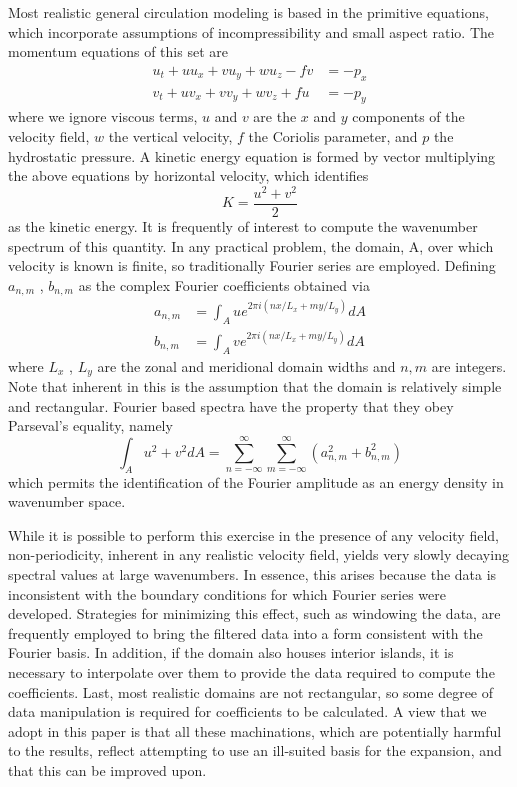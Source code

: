\documentclass[draft]{agujournal2019}
\begin{document}
Most realistic general circulation modeling is based in the primitive equations, which incorporate assumptions of incompressibility and small aspect ratio. The momentum equations of this set are
\begin{subequations}
    \begin{align}
        u_t + uu_x + vu_y + wu_z - fv &= -p_x \\
        v_t + uv_x + vv_y + wv_z + fu &= -p_y
    \end{align}
\end{subequations}
where we ignore viscous terms, $u$ and $v$ are the $x$ and $y$ components of the velocity field, $w$ the vertical velocity, $f$ the Coriolis parameter, and $p$ the hydrostatic pressure. A kinetic energy equation is formed by vector multiplying the above equations by horizontal velocity, which identifies
\begin{equation}
    K = \frac{u^2 + v^2}{2}
\end{equation}
as the kinetic energy. It is frequently of interest to compute the wavenumber spectrum of this quantity. In any practical problem, the domain, A, over which velocity is known is finite, so traditionally Fourier series are employed. Defining $a_{n,m}$ , $b_{n,m}$ as the complex Fourier coefficients obtained via
\begin{subequations}
    \begin{align}
        a_{n,m} &= \int_A u e^{2 \pi i(nx/L_x + my/L_y)} dA \\
        b_{n,m} &= \int_A v e^{2 \pi i(nx/L_x + my/L_y)} dA
    \end{align}
\end{subequations}
where $L_x$ , $L_y$ are the zonal and meridional domain widths and $n, m$ are integers. Note that inherent in this is the assumption that the domain is relatively simple and rectangular. Fourier based spectra have the property that they obey Parseval’s equality, namely
\begin{equation}
    \int_A u^2 + v^2 dA = \sum_{n=-\infty}^{\infty}\sum_{m=-\infty}^{\infty}\left( a_{n,m}^2 + b_{n,m}^2\right)
\end{equation}
which permits the identification of the Fourier amplitude as an energy density in wavenumber space. 

While it is possible to perform this exercise in the presence of any velocity field, non-periodicity, inherent in any realistic velocity field, yields very slowly decaying spectral values at large wavenumbers. In essence, this arises because the data is inconsistent with the boundary conditions for which Fourier series were developed. Strategies for minimizing this effect, such as windowing the data, are frequently employed to bring the filtered data into a form consistent with the Fourier basis. In addition, if the domain also houses interior islands, it is necessary to interpolate over them to provide the data required to compute the coefficients. Last, most realistic domains are not rectangular, so some degree of data manipulation is required for coefficients to be calculated. A view that we adopt in this paper is that all these machinations, which are potentially harmful to the results, reflect attempting to use an ill-suited basis for the expansion, and that this can be improved upon.
\end{document}
